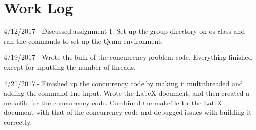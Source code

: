 \documentclass[10pt,onecolumn,journal,draftclsnofoot]{IEEEtran}
\begin{document}


\newpage

\section{Work Log}
\par
4/12/2017 - Discussed assignment 1. Set up the group directory on os-class and ran the commands to set up the Qemu environment.
\par
4/19/2017 - Wrote the bulk of the concurrency problem code. Everything finished except for inputting the number of threads.
\par
4/21/2017 - Finished up the concurrency code by making it multithreaded and adding the command line input. Wrote the LaTeX document, and then created a makefile for the concurrency code. Combined the makefile for the LateX document with that of the concurrency code and debugged issues with building it correctly. 
\end{document}
